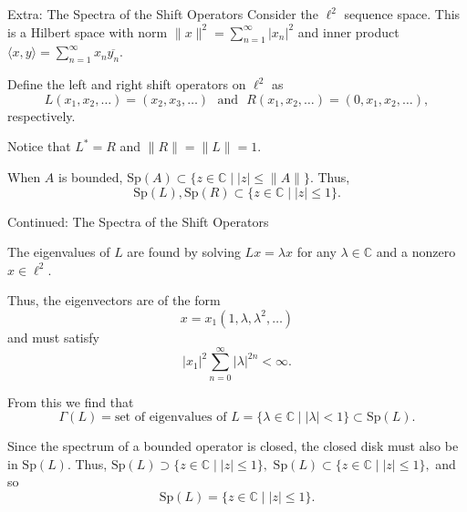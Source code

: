 \documentclass[aspectratio=169]{beamer}
\begin{document}
\appendix 

\begin{frame}{Extra: The Spectra of the Shift Operators}
    Consider the $\ell^2$ sequence space. This is a Hilbert space with norm $\| x \|^2 = \sum_{n=1}^{\infty} |x_n|^2$ and inner product $\langle x, y \rangle = \sum_{n=1}^{\infty} x_n \overline{y_n}.$

    \vspace{1em}

    Define the left and right shift operators on $\ell^2$ as 
    $$ L(x_1, x_2, \dots) = (x_2, x_3, \dots) \,\, \text{ and } \,\, R(x_1, x_2, \dots) = (0, x_1, x_2, \dots),$$
    respectively.

    \vspace{1em}
     
    Notice that $L^* = R$ and $\| R \| = \|L\| = 1.$

    \vspace{1em}

        When $A$ is bounded,
     $\text{Sp}(A) \subset \{ z \in \mathbb{C} \mid |z| \le \|A\| \}.$
    Thus,
     $$ \text{Sp}(L),  \text{Sp}(R) \subset \{ z \in \mathbb{C} \mid |z| \le 1 \}.$$
    
\end{frame}





\begin{frame}{Continued: The Spectra of the Shift Operators}

    The eigenvalues of $L$ are found by solving $Lx = \lambda x$ for any $\lambda \in \mathbb{C}$ and a nonzero $x \in \ell^2.$

     \vspace{0.5em}

    Thus, the eigenvectors are of the form
    $$ x = x_1 (1, \lambda, \lambda^2, \dots)$$
    and must satisfy
    $$ |x_1|^2 \sum_{n=0}^{\infty} |\lambda|^{2n} < \infty.$$


 From this we find that
    $$\Gamma(L) = \text{set of eigenvalues of } L = \{ \lambda \in \mathbb{C} \mid |\lambda| < 1 \} \subset \text{Sp}(L).$$

     \vspace{0.5em}

    Since the spectrum of a bounded operator is closed, the closed disk must also be in $\text{Sp}(L).$ Thus,  $ \text{Sp}(L) \supset \{ z \in \mathbb{C} \mid |z| \le 1 \},$  $ \text{Sp}(L) \subset \{ z \in \mathbb{C} \mid |z| \le 1 \},$ and so
     $$ \text{Sp}(L) = \{ z \in \mathbb{C} \mid |z| \le 1 \}.$$

\end{frame}
\end{document}

